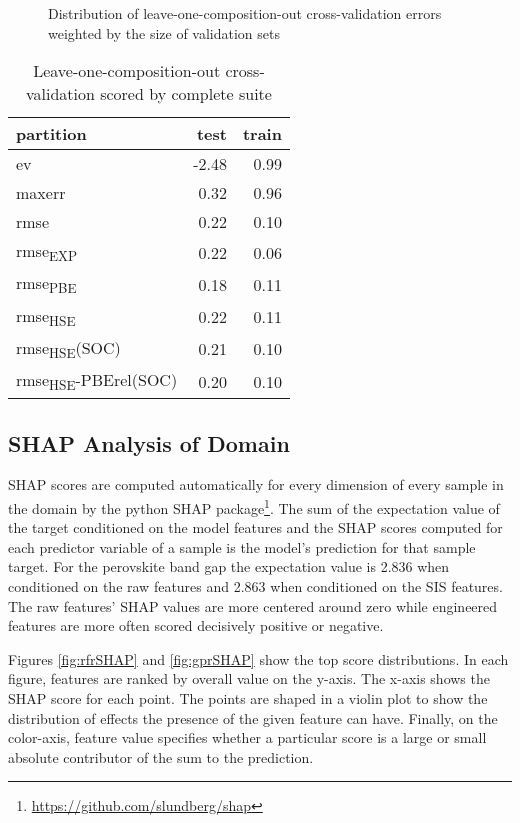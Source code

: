  
\begin{figure}[htbp]
\centering

\caption{\label{fig:errval} Distribution of leave-one-composition-out cross-validation errors weighted by the size of validation sets}
\end{figure}

 
\begin{table}[htbp]
\caption{\label{tbl:errval} Leave-one-composition-out cross-validation scored by complete suite}
\centering
\begin{tabular}{lrr}
partition & test & train\\[0pt]
\hline
ev & -2.48 & 0.99\\[0pt]
maxerr & 0.32 & 0.96\\[0pt]
rmse & 0.22 & 0.10\\[0pt]
rmse\textsubscript{EXP} & 0.22 & 0.06\\[0pt]
rmse\textsubscript{PBE} & 0.18 & 0.11\\[0pt]
rmse\textsubscript{HSE} & 0.22 & 0.11\\[0pt]
rmse\textsubscript{HSE}(SOC) & 0.21 & 0.10\\[0pt]
rmse\textsubscript{HSE}-PBErel(SOC) & 0.20 & 0.10\\[0pt]
\end{tabular}
\end{table}

\subsection{SHAP Analysis of Domain}
\label{sec:org0359b0f}
SHAP scores are computed automatically for every dimension of every sample in the domain by the python SHAP package\footnote{\url{https://github.com/slundberg/shap}}.
The sum of the expectation value of the target conditioned on the model features and the  SHAP scores computed for each predictor variable of a sample is the model's  prediction for that sample target.
\autocite{lundberg-2017-unified-approac}
For the perovskite band gap the expectation value is 2.836 when conditioned on the raw features and 2.863 when conditioned on the SIS features.
The raw features' SHAP values are more centered around zero while engineered features are more often scored decisively positive or negative.

Figures \ref{fig:rfrSHAP} and \ref{fig:gprSHAP} show the top score distributions.
In each figure, features are ranked by overall value on the y-axis.
The x-axis shows the SHAP score for each point.
The points are shaped in a violin plot to show the distribution of effects the presence of the given feature can have.
Finally, on the color-axis, feature value specifies whether a particular score is a large or small absolute contributor of the sum to the prediction.

